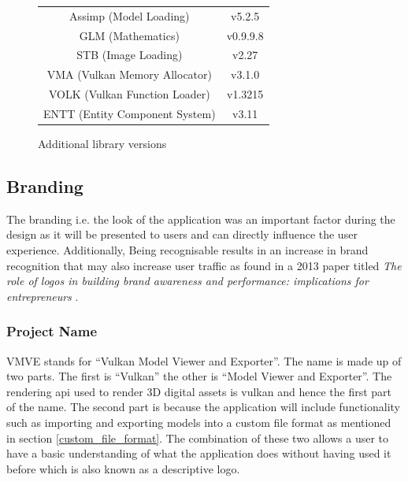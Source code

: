 \documentclass[11pt]{article}
\begin{document}
\begin{figure}[H]
  \begin{center}
    \begin{tabular}{cc}
      
      \rowcolor{gray!50}
      Assimp (Model Loading) &  v5.2.5\\
      GLM (Mathematics) &  v0.9.9.8\\
      STB (Image Loading) &  v2.27 \\
      VMA (Vulkan Memory Allocator) &  v3.1.0 \\
      VOLK (Vulkan Function Loader) & v1.3215 \\
      ENTT (Entity Component System) & v3.11 \\
    \end{tabular}
  \end{center}
  \caption{Additional library versions}
  \label{fig:library_versions}
  \end{figure}

\subsection{Branding}
The branding i.e. the look of the application was an important factor during the
design as it will be presented to users and can directly influence the user
experience. Additionally, Being recognisable results in an increase in brand
recognition that may also increase user traffic as found in a 2013 paper titled
\textit{The role of logos in building brand awareness and performance:
implications for entrepreneurs} \cite{girard2013role}.

\subsubsection{Project Name}
VMVE stands for ``Vulkan Model Viewer and Exporter''. The name is made up of two
parts. The first is ``Vulkan'' the other is ``Model Viewer and Exporter''. The
rendering \gls*{api} used to render 3D digital assets is \gls*{vulkan} and hence
the first part of the name. The second part is because the application will
include functionality such as importing and exporting models into a custom file
format as mentioned in section \ref{custom_file_format}. The combination of
these two allows a user to have a basic understanding of what the application
does without having used it before which is also known as a descriptive logo.
\end{document}
